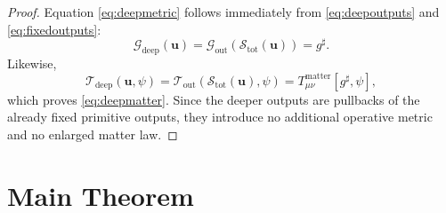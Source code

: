 \documentclass[11pt]{article}
\newcommand{\CompletedMetric}{g^{\sharp}}
\newcommand{\MetricOut}{\mathscr G_{\mathrm{out}}}
\newcommand{\MatterOut}{\mathscr T_{\mathrm{out}}}
\newcommand{\DeepMetricOut}{\mathscr G_{\mathrm{deep}}}
\newcommand{\DeepMatterOut}{\mathscr T_{\mathrm{deep}}}
\newcommand{\ChainSelectTriple}{\mathcal S_{\mathrm{tot}}}
\begin{document}
\begin{proof}
Equation \eqref{eq:deepmetric} follows immediately from \eqref{eq:deepoutputs} and \eqref{eq:fixedoutputs}:
\[
\DeepMetricOut(\mathbf u)
=
\MetricOut(\ChainSelectTriple(\mathbf u))
=
\CompletedMetric.
\]
Likewise,
\[
\DeepMatterOut(\mathbf u,\psi)
=
\MatterOut(\ChainSelectTriple(\mathbf u),\psi)
=
T_{\mu\nu}^{\mathrm{matter}}[\CompletedMetric,\psi],
\]
which proves \eqref{eq:deepmatter}. Since the deeper outputs are pullbacks of the already fixed primitive outputs, they introduce no additional operative metric and no enlarged matter law.
\end{proof}

\section{Main Theorem}
\end{document}
